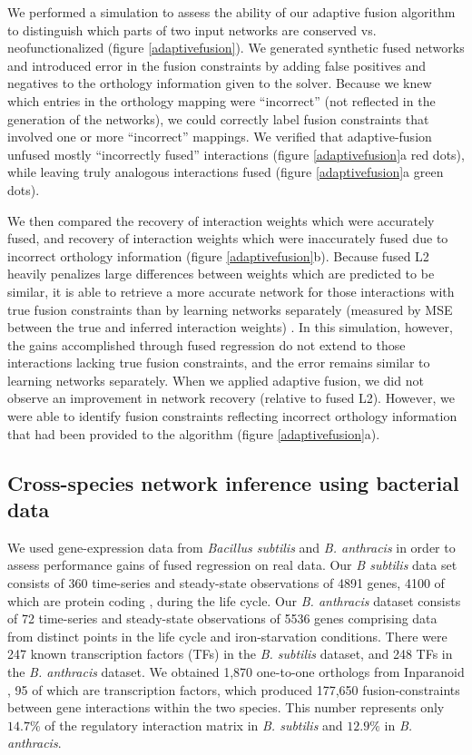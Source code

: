 \documentclass[11pt]{article}
\begin{document}
We performed a simulation to assess the ability of our adaptive fusion algorithm to distinguish which parts of two input networks are conserved vs. neofunctionalized (figure \ref{adaptivefusion}). We generated synthetic fused networks and introduced error in the fusion constraints by adding false positives and negatives to the orthology information given to the solver. 
Because we knew which entries in the orthology mapping were ``incorrect'' (not reflected in the generation of the networks), we could correctly label fusion constraints that involved one or more ``incorrect'' mappings. 
We verified that adaptive-fusion unfused mostly ``incorrectly fused'' interactions (figure \ref{adaptivefusion}a red dots), while leaving truly analogous interactions fused (figure \ref{adaptivefusion}a green dots). 

We then compared the recovery of interaction weights which were accurately fused, and recovery of interaction weights which were inaccurately fused due to incorrect orthology information (figure \ref{adaptivefusion}b). 
Because fused L2 heavily penalizes large differences between weights which are predicted to be similar, it is able to retrieve a more accurate network for those interactions with true fusion constraints than by learning networks separately (measured by MSE between the true and inferred interaction weights) . 
In this simulation, however, the gains accomplished through fused regression do not extend to those interactions lacking true fusion constraints, and the error remains similar to learning networks separately. When we applied adaptive fusion, we did not observe an improvement in network recovery (relative to fused L2). 
However, we were able to identify fusion constraints reflecting incorrect orthology information that had been provided to the algorithm (figure \ref{adaptivefusion}a). 

\subsection{Cross-species network inference using bacterial data}
We used gene-expression data from \textit{Bacillus subtilis} and \textit{B. anthracis} in order to assess performance gains of fused regression on real data. 
Our \textit{B subtilis} data set consists of 360 time-series and steady-state observations of 4891 genes, 4100 of which are protein coding \cite{kunst_complete_1997}, during the life cycle. 
Our \textit{\textit{B. anthracis}} dataset consists of 72 time-series and steady-state observations of 5536 genes comprising data from distinct points in the life cycle and iron-starvation conditions. 
There were 247 known transcription factors (TFs) in the \textit{\textit{B. subtilis}} dataset, and 248 TFs in the \textit{B. anthracis} dataset.
We obtained 1,870 one-to-one orthologs from Inparanoid \cite{ostlund_inparanoid_2010}, 95 of which are transcription factors, which produced 177,650 fusion-constraints between gene interactions within the two species. 
This number represents only $14.7\%$ of the regulatory interaction matrix in \textit{B. subtilis} and $12.9\%$ in \textit{B. anthracis}. 
\end{document}
